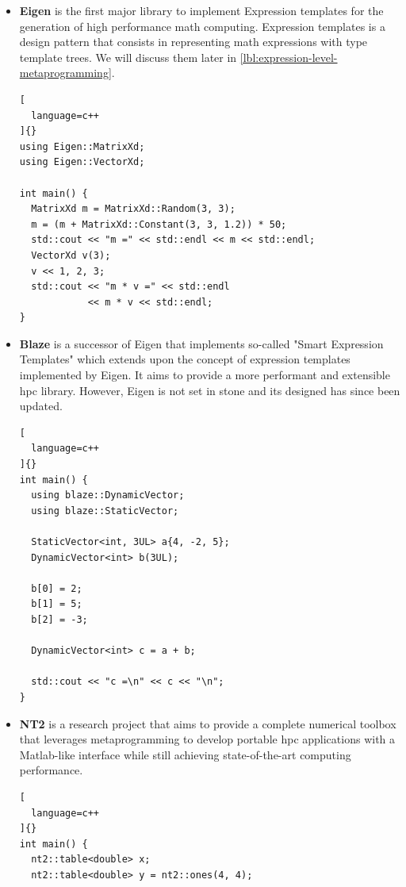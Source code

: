 \documentclass[../main]{subfiles}
\begin{document}
\begin{itemize}

  \item

\textbf{Eigen} \cite{eigen} is the first major \cpp library to implement
Expression templates for the generation of high performance math computing.
Expression templates is a \cpp design pattern that consists in representing
math expressions with type template trees. We will discuss them later
in \ref{lbl:expression-level-metaprogramming}.

\begin{lstlisting}[
  language=c++
]{}
using Eigen::MatrixXd;
using Eigen::VectorXd;

int main() {
  MatrixXd m = MatrixXd::Random(3, 3);
  m = (m + MatrixXd::Constant(3, 3, 1.2)) * 50;
  std::cout << "m =" << std::endl << m << std::endl;
  VectorXd v(3);
  v << 1, 2, 3;
  std::cout << "m * v =" << std::endl
            << m * v << std::endl;
}
\end{lstlisting}

  \item

\textbf{Blaze} \cite{blazelib} is a successor of Eigen that implements so-called
"Smart Expression Templates" which extends upon the concept of
expression templates implemented by Eigen. It aims to provide a more performant
and extensible \gls{hpc} library. However, Eigen is not set in stone
and its designed has since been updated.

\begin{lstlisting}[
  language=c++
]{}
int main() {
  using blaze::DynamicVector;
  using blaze::StaticVector;

  StaticVector<int, 3UL> a{4, -2, 5};
  DynamicVector<int> b(3UL);

  b[0] = 2;
  b[1] = 5;
  b[2] = -3;

  DynamicVector<int> c = a + b;

  std::cout << "c =\n" << c << "\n";
}
\end{lstlisting}

  \item

\textbf{NT2} \cite{nt2} is a research project that aims to provide a complete
numerical toolbox that leverages metaprogramming to develop portable \gls{hpc}
applications with a Matlab-like interface while still achieving state-of-the-art
computing performance.

\begin{lstlisting}[
  language=c++
]{}
int main() {
  nt2::table<double> x;
  nt2::table<double> y = nt2::ones(4, 4);


\end{lstlisting}
\end{itemize}
\end{document}
